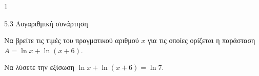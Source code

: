 \begin{ylh}{1}
\item 5.3 Λογαριθμική συνάρτηση
\end{ylh}
\begin{alist}
\item Να βρείτε τις τιμές του πραγματικού αριθμού $x$ για τις οποίες ορίζεται η παράσταση
$A = \ln x + \ln(x + 6)$.
\item Να λύσετε την εξίσωση
$\ln x + \ln(x + 6) = \ln 7$.
\end{alist}

